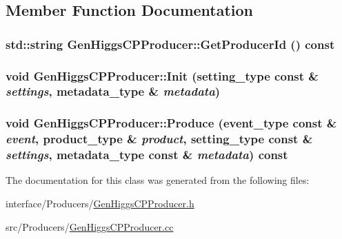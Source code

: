 \subsection{Member Function Documentation}
\hypertarget{classGenHiggsCPProducer_a3c3c147d611f380e3c7792e9270d077a}{
\subsubsection[{GetProducerId}]{\setlength{\rightskip}{0pt plus 5cm}std::string GenHiggsCPProducer::GetProducerId () const}}
\label{classGenHiggsCPProducer_a3c3c147d611f380e3c7792e9270d077a}
\hypertarget{classGenHiggsCPProducer_a2a9684adf876986504e04c14e559b6b6}{
\subsubsection[{Init}]{\setlength{\rightskip}{0pt plus 5cm}void GenHiggsCPProducer::Init (setting\_\-type const \& {\em settings}, \/  metadata\_\-type \& {\em metadata})}}
\label{classGenHiggsCPProducer_a2a9684adf876986504e04c14e559b6b6}
\hypertarget{classGenHiggsCPProducer_ae1d7a6b1ae4a38f810ce8786bdf3d520}{
\subsubsection[{Produce}]{\setlength{\rightskip}{0pt plus 5cm}void GenHiggsCPProducer::Produce (event\_\-type const \& {\em event}, \/  product\_\-type \& {\em product}, \/  setting\_\-type const \& {\em settings}, \/  metadata\_\-type const \& {\em metadata}) const}}
\label{classGenHiggsCPProducer_ae1d7a6b1ae4a38f810ce8786bdf3d520}


The documentation for this class was generated from the following files:\begin{DoxyCompactItemize}
\item 
interface/Producers/\hyperlink{GenHiggsCPProducer_8h}{GenHiggsCPProducer.h}\item 
src/Producers/\hyperlink{GenHiggsCPProducer_8cc}{GenHiggsCPProducer.cc}\end{DoxyCompactItemize}

